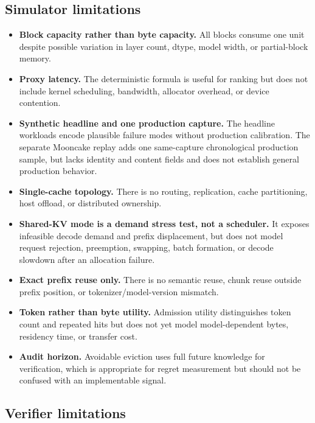 \documentclass[11pt]{article}
\begin{document}
\subsection{Simulator limitations}

\begin{itemize}
  \item \textbf{Block capacity rather than byte capacity.} All blocks consume one unit
  despite possible variation in layer count, dtype, model width, or partial-block
  memory.
  \item \textbf{Proxy latency.} The deterministic formula is useful for ranking but does
  not include kernel scheduling, bandwidth, allocator overhead, or device contention.
  \item \textbf{Synthetic headline and one production capture.} The headline workloads
  encode plausible failure modes without production calibration.  The separate
  Mooncake replay adds one same-capture chronological production sample, but lacks
  identity and content fields and does not establish general production behavior.
  \item \textbf{Single-cache topology.} There is no routing, replication, cache
  partitioning, host offload, or distributed ownership.
  \item \textbf{Shared-KV mode is a demand stress test, not a scheduler.} It exposes
  infeasible decode demand and prefix displacement, but does not model request
  rejection, preemption, swapping, batch formation, or decode slowdown after an
  allocation failure.
  \item \textbf{Exact prefix reuse only.} There is no semantic reuse, chunk reuse outside
  prefix position, or tokenizer/model-version mismatch.
  \item \textbf{Token rather than byte utility.} Admission utility distinguishes token
  count and repeated hits but does not yet model model-dependent bytes, residency time,
  or transfer cost.
  \item \textbf{Audit horizon.} Avoidable eviction uses full future knowledge for
  verification, which is appropriate for regret measurement but should not be confused
  with an implementable signal.
\end{itemize}

\subsection{Verifier limitations}
\end{document}
